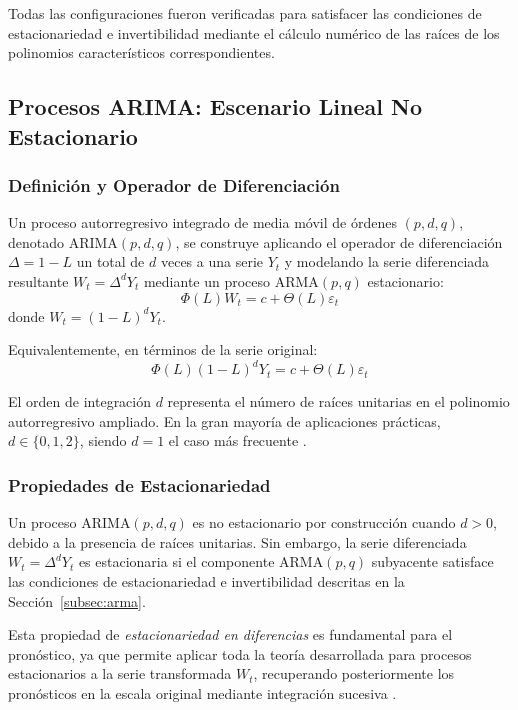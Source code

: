 Todas las configuraciones fueron verificadas para satisfacer las condiciones de estacionariedad e invertibilidad mediante el cálculo numérico de las raíces de los polinomios característicos correspondientes.

\subsection{Procesos ARIMA: Escenario Lineal No Estacionario}
\label{subsec:arima}

\subsubsection{Definición y Operador de Diferenciación}

Un proceso autorregresivo integrado de media móvil de órdenes $(p,d,q)$, denotado ARIMA$(p,d,q)$, se construye aplicando el operador de diferenciación $\Delta = 1 - L$ un total de $d$ veces a una serie $Y_t$ y modelando la serie diferenciada resultante $W_t = \Delta^d Y_t$ mediante un proceso ARMA$(p,q)$ estacionario:
\begin{equation}
\Phi(L) W_t = c + \Theta(L) \varepsilon_t
\label{eq:arima_general}
\end{equation}
donde $W_t = (1-L)^d Y_t$.

Equivalentemente, en términos de la serie original:
\begin{equation}
\Phi(L)(1-L)^d Y_t = c + \Theta(L) \varepsilon_t
\label{eq:arima_original_scale}
\end{equation}

El orden de integración $d$ representa el número de raíces unitarias en el polinomio autorregresivo ampliado. En la gran mayoría de aplicaciones prácticas, $d \in \{0, 1, 2\}$, siendo $d=1$ el caso más frecuente \parencite{Hyndman2021FPP3}.

\subsubsection{Propiedades de Estacionariedad}

Un proceso ARIMA$(p,d,q)$ es no estacionario por construcción cuando $d > 0$, debido a la presencia de raíces unitarias. Sin embargo, la serie diferenciada $W_t = \Delta^d Y_t$ es estacionaria si el componente ARMA$(p,q)$ subyacente satisface las condiciones de estacionariedad e invertibilidad descritas en la Sección~\ref{subsec:arma}.

Esta propiedad de \textit{estacionariedad en diferencias} es fundamental para el pronóstico, ya que permite aplicar toda la teoría desarrollada para procesos estacionarios a la serie transformada $W_t$, recuperando posteriormente los pronósticos en la escala original mediante integración sucesiva \parencite{Hyndman2021FPP3}.

